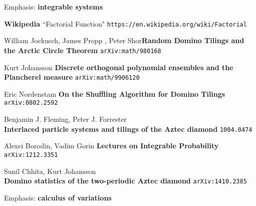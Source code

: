 \documentclass[12pt]{article}
\begin{document}
\newpage

\noindent Emphasis:  \textbf{integrable systems}


\selectfont \fontsize{12}{10}\selectfont

\begin{thebibliography}{}

\item \textbf{Wikipedia} ``Factorial Function" \texttt{https://en.wikipedia.org/wiki/Factorial}

\item William Jockusch, James Propp , Peter Shor\textbf{Random Domino Tilings and the Arctic Circle Theorem} \texttt{arXiv:math/980168}

\item Kurt Johansson \textbf{Discrete orthogonal polynomial ensembles and the Plancherel measure} \texttt{arXiv:math/9906120}

\item Eric Nordenstam \textbf{On the Shuffling Algorithm for Domino Tilings} \texttt{arXiv:0802.2592}

\item Benjamin J. Fleming, Peter J. Forrester \\ \textbf{Interlaced particle systems and tilings of the Aztec diamond} \texttt{1004.0474}

\item Alexei Borodin, Vadim Gorin \textbf{Lectures on Integrable Probability} \texttt{arXiv:1212.3351}

\item Sunil Chhita, Kurt Johansson \\ \textbf{Domino statistics of the two-periodic Aztec diamond} \texttt{arXiv:1410.2385}

\end{thebibliography}

\selectfont \fontsize{20}{25}\selectfont

\noindent Emphasis:  \textbf{calculus of variations}


\selectfont \fontsize{12}{10}\selectfont

\begin{thebibliography}{}

\item 

\end{thebibliography}

\selectfont \fontsize{20}{25}\selectfont
\end{document}
